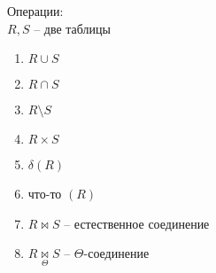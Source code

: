 Операции: \\
$R, S$ -- две таблицы
\begin{enumerate}
	\item $ R \cup S$
    \item $ R \cap S$
    \item $ R \setminus S$
    \item $ R \times S$
    \item $ \delta (R) $
    \item что-то $(R)$
    \item $R \bowtie S$ -- естественное соединение
    \item $R \underset\Theta\bowtie S$ -- $\Theta$-соединение
\end{enumerate}

